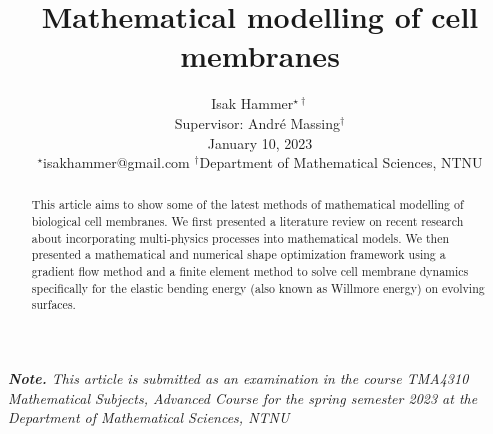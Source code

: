 \documentclass[10pt,conference]{IEEEtran}
\title{ {\Large \textbf{Mathematical modelling of cell membranes }} }
\begin{document}
\author{
Isak Hammer$^{\star\dagger}$  \\
{\small Supervisor: André Massing$^{\dagger} $  } \\
{\small  January 10, 2023}\\
{\footnotesize $^\star$isakhammer@gmail.com }
{\footnotesize $^\dagger$Department of Mathematical Sciences, NTNU}\\
}

\maketitle
\begin{sloppy}
\textit{ \textbf{Note.} This article is submitted as an examination in the course TMA4310 Mathematical Subjects, Advanced Course for the spring semester 2023 at the Department of Mathematical Sciences, NTNU \\}


\begin{abstract}
This article aims to show some of the latest methods of mathematical modelling of biological cell membranes. We first presented a literature review on recent research about incorporating multi-physics processes into mathematical models. We then presented a
mathematical and numerical shape optimization framework using a gradient flow method and
a finite element method to solve cell membrane dynamics specifically for the elastic bending energy (also known as Willmore energy) on evolving surfaces.
\end{abstract}

    
    
    
    
    

    \printbibliography
\end{sloppy}
\end{document}

